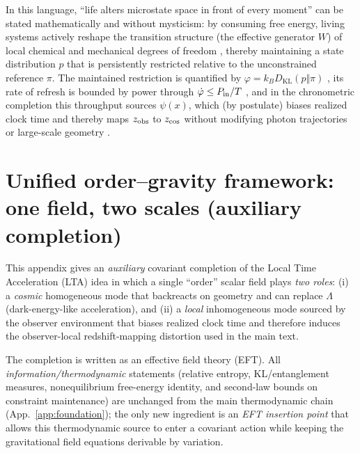 \documentclass[10pt]{article}
\begin{document}
In this language, ``life alters microstate space in front of every moment'' can be stated
mathematically and without mysticism: by consuming free energy, living systems actively reshape the
transition structure (the effective generator \(W\)) of local chemical and mechanical degrees of
freedom \cite{Seifert2012ST}, thereby maintaining a state distribution \(p\) that is persistently
restricted relative to the unconstrained reference \(\pi\).
The maintained restriction is quantified by \(\varphi=k_B D_{\mathrm{KL}}(p\Vert\pi)\)
\cite{KullbackLeibler1951,CoverThomas2006}, its rate of refresh is bounded by power through
\(\dot\varphi\le P_{\rm in}/T\) \cite{Seifert2012ST}, and in the chronometric completion this
throughput sources \(\psi(x)\), which (by postulate) biases realized clock time and thereby maps
\(z_{\rm obs}\) to \(z_{\rm cos}\) without modifying photon trajectories or large-scale geometry
\cite{Wald1984GR,Faraoni2004ST}.



\section{Unified order--gravity framework: one field, two scales (auxiliary completion)}
\label{app:unified_order_gravity}

This appendix gives an \emph{auxiliary} covariant completion of the Local Time Acceleration (LTA)
idea in which a single ``order'' scalar field plays \emph{two roles}:
(i) a \emph{cosmic} homogeneous mode that backreacts on geometry and can replace $\Lambda$
(dark-energy-like acceleration), and
(ii) a \emph{local} inhomogeneous mode sourced by the observer environment that biases realized
clock time and therefore induces the observer-local redshift-mapping distortion used in the main text.

The completion is written as an effective field theory (EFT). All \emph{information/thermodynamic}
statements (relative entropy, KL/entanglement measures, nonequilibrium free-energy identity, and
second-law bounds on constraint maintenance) are unchanged from the main thermodynamic chain
(App.~\ref{app:foundation}); the only new ingredient is an \emph{EFT insertion point} that allows
this thermodynamic source to enter a covariant action while keeping the gravitational field equations
derivable by variation.
\end{document}

